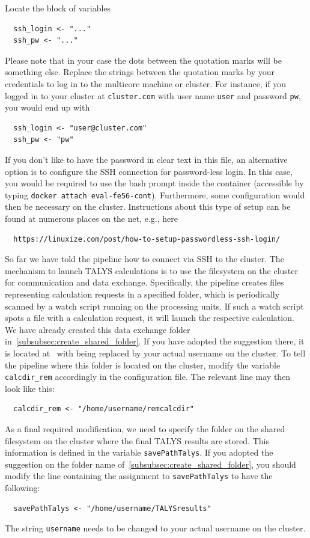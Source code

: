 \documentclass[12pt,a4paper]{scrartcl}
\begin{document}
Locate the block of variables
\begin{verbatim}
  ssh_login <- "..."
  ssh_pw <- "..."
\end{verbatim}
Please note that in your case the dots between the quotation marks will be something else.
Replace the strings between the quotation marks by your credentials to log in to the multicore machine or cluster.
For instance, if you logged in to your cluster at \verb#cluster.com# with user name \verb#user# and password \verb#pw#, you would end up with
\begin{verbatim}
  ssh_login <- "user@cluster.com"
  ssh_pw <- "pw"
\end{verbatim}
If you don't like to have the password in clear text in this file, an alternative option is to configure the SSH connection for password-less login.
In this case, you would be required to use the bash prompt inside the container (accessible by typing \verb#docker attach eval-fe56-cont#).
Furthermore, some configuration would then be necessary on the cluster.
Instructions about this type of setup can be found at numerous places on the net, e.g., here
\begin{verbatim}
  https://linuxize.com/post/how-to-setup-passwordless-ssh-login/
\end{verbatim}
So far we have told the pipeline how to connect via SSH to the cluster.
The mechanism to launch TALYS calculations is to use the filesystem on the cluster for communication and data exchange.
Specifically, the pipeline creates files representing calculation requests in a specified folder, which is periodically scanned by a watch script running on the processing units.
If such a watch script spots a file with a calculation request, it will launch the respective calculation.
We have already created this data exchange folder in~\cref{subsubsec:create_shared_folder}.
If you have adopted the suggestion there, it is located at~ with  being replaced by your actual username on the cluster.
To tell the pipeline where this folder is located on the cluster, modify the variable \verb#calcdir_rem# accordingly in the configuration file.
The relevant line may then look like this:
\begin{verbatim}
  calcdir_rem <- "/home/username/remcalcdir"
\end{verbatim}
As a final required modification, we need to specify the folder on the shared filesystem on the cluster where the final TALYS results are stored.
This information is defined in the variable \verb#savePathTalys#.
If you adopted the suggestion on the folder name of~\cref{subsubsec:create_shared_folder}, you should modify the line containing the assignment to \verb#savePathTalys# to have the following:
\begin{verbatim}
  savePathTalys <- "/home/username/TALYSresults"
\end{verbatim}
The string \verb#username# needs to be changed to your actual username on the cluster.
\end{document}
